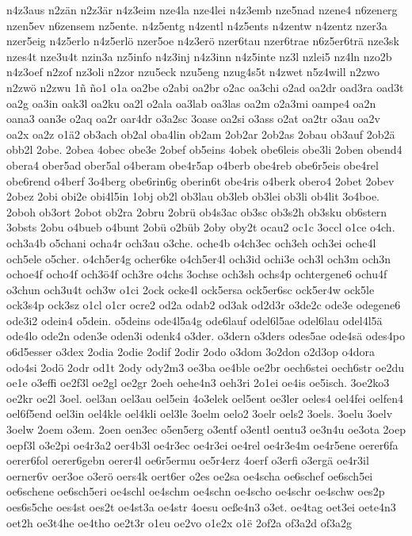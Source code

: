 {n4z3aus
n2zän
n2z3är
n4z3eim
nze4la
nze4lei
n4z3emb
nze5nad
nzene4
n6zenerg
nzen5ev
n6zensem
nz5ente.
n4z5entg
n4zentl
n4z5ents
n4zentw
n4zentz
nzer3a
nzer5eig
n4z5erlo
n4z5erlö
nzer5oe
n4z3erö
nzer6tau
nzer6trae
n6z5er6trä
nze3sk
nzes4t
nze3u4t
nzin3a
nz5info
n4z3inj
n4z3inn
n4z5inte
nz3l
nzlei5
nz4ln
nzo2b
n4z3oef
n2zof
nz3oli
n2zor
nzu5eck
nzu5eng
nzug4s5t
n4zwet
n5z4will
n2zwo
n2zwö
n2zwu
1ñ
ño1
o1a
oa2be
o2abi
oa2br
o2ac
oa3chi
o2ad
oa2dr
oad3ra
oad3t
oa2g
oa3in
oak3l
oa2ku
oa2l
o2ala
oa3lab
oa3las
oa2m
o2a3mi
oampe4
oa2n
oana3
oan3e
o2aq
oa2r
oar4dr
o3a2sc
3oase
oa2si
o3ass
o2at
oa2tr
o3au
oa2v
oa2x
oa2z
o1ä2
ob3ach
ob2al
oba4lin
ob2am
2ob2ar
2ob2as
2obau
ob3auf
2ob2ä
obb2l
2obe.
2obea
4obec
obe3e
2obef
ob5eins
4obek
obe6leis
obe3li
2oben
obend4
obera4
ober5ad
ober5al
o4beram
obe4r5ap
o4berb
obe4reb
obe6r5eis
obe4rel
obe6rend
o4berf
3o4berg
obe6rin6g
oberin6t
obe4ris
o4berk
obero4
2obet
2obev
2obez
2obi
obi2e
obi4l5in
1obj
ob2l
ob3lau
ob3leb
ob3lei
ob3li
ob4lit
3o4boe.
2oboh
ob3ort
2obot
ob2ra
2obru
2obrü
ob4s3ac
ob3sc
ob3s2h
ob3sku
ob6stern
3obsts
2obu
o4bueb
o4bunt
2obü
o2büb
2oby
oby2t
ocau2
oc1c
3occl
o1ce
o4ch.
och3a4b
o5chani
ocha4r
och3au
o3che.
oche4b
o4ch3ec
och3eh
och3ei
oche4l
och5ele
o5cher.
o4ch5er4g
ocher6ke
o4ch5er4l
och3id
ochi3e
och3l
och3m
och3n
ochoe4f
ocho4f
och3ö4f
och3re
o4chs
3ochse
och3sh
ochs4p
ochtergene6
ochu4f
o3chun
och3u4t
och3w
o1ci
2ock
ocke4l
ock5ersa
ock5er6sc
ock5er4w
ock5le
ock3s4p
ock3sz
o1cl
o1cr
ocre2
od2a
odab2
od3ak
od2d3r
o3de2c
ode3e
odegene6
ode3i2
odein4
o5dein.
o5deins
ode4l5a4g
ode6lauf
odel6l5ae
odel6lau
odel4l5ä
ode4lo
ode2n
oden3e
oden3i
odenk4
o3der.
o3dern
o3ders
odes5ae
ode4sä
odes4po
o6d5esser
o3dex
2odia
2odie
2odif
2odir
2odo
o3dom
3o2don
o2d3op
o4dora
odo4si
2odö
2odr
od1t
2ody
ody2m3
oe3ba
oe4ble
oe2br
oech6stei
oech6str
oe2du
oe1e
o3effi
oe2f3l
oe2gl
oe2gr
2oeh
oehe4n3
oeh3ri
2o1ei
oe4is
oe5isch.
3oe2ko3
oe2kr
oe2l
3oel.
oel3an
oel3au
oel5ein
4o3elek
oel5ent
oe3ler
oeles4
oel4fei
oelfen4
oel6f5end
oel3in
oel4kle
oel4kli
oel3le
3oelm
oelo2
3oelr
oels2
3oels.
3oelu
3oelv
3oelw
2oem
o3em.
2oen
oen3ec
o5en5erg
o3entf
o3entl
oentu3
oe3n4u
oe3ota
2oep
oepf3l
o3e2pi
oe4r3a2
oer4b3l
oe4r3ec
oe4r3ei
oe4rel
oe4r3e4m
oe4r5ene
oerer6fa
oerer6fol
oerer6gebn
oerer4l
oe6r5ermu
oe5r4erz
4oerf
o3erfi
o3ergä
oe4r3il
oerner6v
oer3oe
o3erö
oers4k
oert6er
o2es
oe2sa
oe4scha
oe6schef
oe6sch5ei
oe6schene
oe6sch5eri
oe4schl
oe4schm
oe4schn
oe4scho
oe4schr
oe4schw
oes2p
oes6s5che
oes4st
oes2t
oe4st3a
oe4str
4oesu
oeße4n3
o3et.
oe4tag
oet3ei
oete4n3
oet2h
oe3t4he
oe4tho
oe2t3r
o1eu
oe2vo
o1e2x
o1ë
2of2a
of3a2d
of3a2g
}
